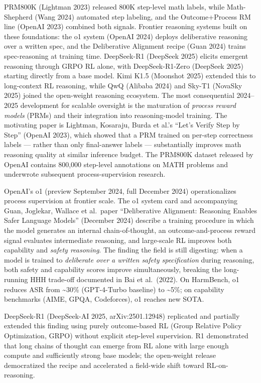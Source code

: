 PRM800K (Lightman 2023) released 800K step-level math labels, while Math-Shepherd (Wang 2024) automated step labeling, and the Outcome+Process RM line (OpenAI 2023) combined both signals. Frontier reasoning systems built on these foundations: the o1 system (OpenAI 2024) deploys deliberative reasoning over a written spec, and the Deliberative Alignment recipe (Guan 2024) trains spec-reasoning at training time. DeepSeek-R1 (DeepSeek 2025) elicits emergent reasoning through GRPO RL alone, with DeepSeek-R1-Zero (DeepSeek 2025) starting directly from a base model. Kimi K1.5 (Moonshot 2025) extended this to long-context RL reasoning, while QwQ (Alibaba 2024) and Sky-T1 (NovaSky 2025) joined the open-weight reasoning ecosystem. The most consequential 2024--2025 development for scalable oversight is the maturation of \emph{process reward models} (PRMs) and their integration into reasoning-model training. The motivating paper is Lightman, Kosaraju, Burda et al.'s ``Let's Verify Step by Step'' (OpenAI 2023), which showed that a PRM trained on per-step correctness labels --- rather than only final-answer labels --- substantially improves math reasoning quality at similar inference budget. The PRM800K dataset released by OpenAI contains 800,000 step-level annotations on MATH problems and underwrote subsequent process-supervision research.

OpenAI's o1 (preview September 2024, full December 2024) operationalizes process supervision at frontier scale. The o1 system card and accompanying Guan, Joglekar, Wallace et al.~paper ``Deliberative Alignment: Reasoning Enables Safer Language Models'' (December 2024) describe a training procedure in which the model generates an internal chain-of-thought, an outcome-and-process reward signal evaluates intermediate reasoning, and large-scale RL improves both capability and \emph{safety reasoning}. The finding the field is still digesting: when a model is trained to \emph{deliberate over a written safety specification} during reasoning, both safety and capability scores improve simultaneously, breaking the long-running HHH trade-off documented in Bai et al.~(2022). On HarmBench, o1 reduces ASR from \textasciitilde30\% (GPT-4-Turbo baseline) to \textasciitilde5\%; on capability benchmarks (AIME, GPQA, Codeforces), o1 reaches new SOTA.

DeepSeek-R1 (DeepSeek-AI 2025, arXiv:2501.12948) replicated and partially extended this finding using purely outcome-based RL (Group Relative Policy Optimization, GRPO) without explicit step-level supervision. R1 demonstrated that long chains of thought can emerge from RL alone with large enough compute and sufficiently strong base models; the open-weight release democratized the recipe and accelerated a field-wide shift toward RL-on-reasoning.

